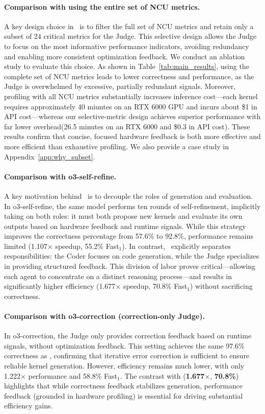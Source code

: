 \paragraph{{Comparison with using the entire set of NCU metrics.}}
\label{NCU}
A key design choice in \agentname~is to filter the full set of NCU metrics and retain only a subset of 24 critical metrics for the Judge.
This selective design allows the Judge to focus on the most informative performance indicators, avoiding redundancy and enabling more consistent optimization feedback.
We conduct an ablation study to evaluate this choice.
As shown in Table~\ref{tab:main_results}, using the complete set of NCU metrics leads to lower correctness and performance, as the Judge is overwhelmed by excessive, partially redundant signals.
Moreover, profiling with all NCU metrics substantially increases inference cost—each kernel requires approximately 40 miuntes on an RTX 6000 GPU and incurs about \$1 in API cost—whereas our selective-metric design achieves superior performance with far lower overhead(26.5 minutes on an RTX 6000 and \$0.3 in API cost).
These results confirm that concise, focused hardware feedback is both more effective and more efficient than exhaustive profiling. We also provide a case study in Appendix~\ref {app:why_subset}.

\paragraph{Comparison with o3-self-refine.}  
A key motivation behind \agentname~is to decouple the roles of generation and evaluation.  
In o3-self-refine, the same model performs ten rounds of self-refinement, implicitly taking on both roles: it must both propose new kernels and evaluate its own outputs based on hardware feedback and runtime signals.  
While this strategy improves the correctness percentage from 57.6\%  to 92.8\%, performance remains limited ({1.107$\times$} speedup, {55.2\% Fast$_1$}).  
In contrast, \agentname~explicitly separates responsibilities: the Coder focuses on code generation, while the Judge specializes in providing structured feedback.  
This division of labor proves critical—allowing each agent to concentrate on a distinct reasoning process—and results in significantly higher efficiency ({1.677$\times$} speedup, {70.8\% Fast$_1$}) without sacrificing correctness.
\label{Ablation-agents}
\paragraph{Comparison with o3-correction (correction-only Judge).}  
In o3-correction, the Judge only provides correction feedback based on runtime signals, without optimization feedback.  
This setting achieves the same {97.6\% correctness} as \agentname, confirming that iterative error correction is sufficient to ensure reliable kernel generation.  
However, efficiency remains much lower, with only {1.222$\times$} performance and {58.8\% Fast$_1$}.  
The contrast with \agentname (\textbf{1.677$\times$}, \textbf{70.8\%}) highlights that while correctness feedback stabilizes generation, performance feedback (grounded in hardware profiling) is essential for driving substantial efficiency gains.

